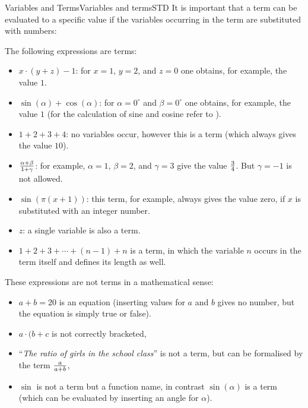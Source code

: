 \begin{MXContent}{Variables and Terms}{Variables and terms}{STD}
It is important that a term can be evaluated to a specific value if the variables occurring in the term are substituted 
with numbers:
\newpage
\begin{MExample}
The following expressions are terms:
\begin{itemize}
\item{$x\cdot (y+z)-1$: for $x=1$, $y=2$, and $z=0$ one obtains, for example, the value $1$.}
\item{$\sin(\alpha)+\cos(\alpha)$: for $\alpha=0^\circ$ and $\beta=0^\circ$ one obtains, for example, the value $1$ 
(for the calculation of sine and cosine refer to ).}
\item{$1+2+3+4$: no variables occur, however this is a term (which always gives the value $10$).}
\item{$\tfrac{\alpha+\beta}{1+\gamma}$: for example, $\alpha=1$, $\beta=2$, and $\gamma=3$ give the value 
$\tfrac{3}{4}$. But $\gamma=-1$ is not allowed.}
\item{$\sin(\pi (x+1))$: this term, for example, always gives the value zero, if $x$ is substituted with an integer number.}
\item{$z$: a single variable is also a term.}
\item{$1+2+3+\cdots+(n-1)+n$ is a term, in which the variable $n$ occurs in the term itself and defines 
its length as well.}
\end{itemize}
\end{MExample}

\begin{MExample}
These expressions are not terms in a mathematical sense:
\begin{itemize}
\item{$a+b=20$ is an equation (inserting values for $a$ and $b$ gives no number, but the equation is simply true or false).}
\item{$a\cdot (b+c$ is not correctly bracketed,}
\item{``\textit{The ratio of girls in the school class}'' is not a term, 
but can be formalised by the term $\tfrac{a}{a+b}$,}
\item{$\sin$ is not a term but a function name, in contrast $\sin(\alpha)$ is a term (which can be evaluated by 
inserting an angle for $\alpha$).}
\end{itemize}
\end{MExample}


\end{MXContent}
